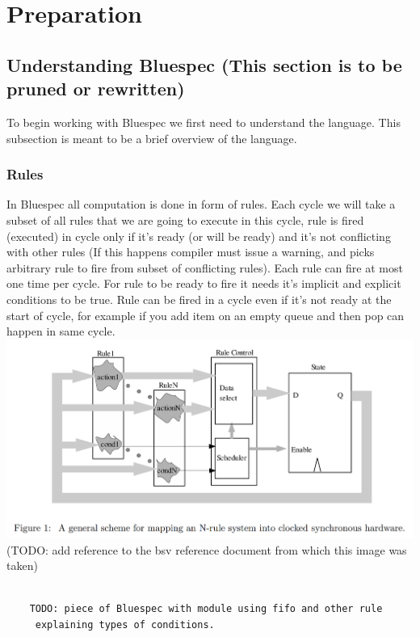\documentclass[14pt]{report}
\begin{document}
\chapter{Preparation}

\section{Understanding Bluespec (This section is to be pruned or rewritten)}
To begin working with Bluespec we first need to understand the language. This subsection is meant to be a brief overview of the language.
\subsection{Rules}
 In Bluespec all computation is done in form of rules. Each cycle we will take a subset of all rules that we are going to execute in this cycle, rule is fired (executed) in cycle only if it's ready (or will be ready) and it's not conflicting with other rules (If this happens compiler must issue a warning, and picks arbitrary rule to fire from subset of conflicting rules). Each rule can fire at most one time per cycle. For rule to be ready to fire it needs it's implicit and explicit conditions to be true. Rule can be fired in a cycle even if it's not ready at the start of cycle, for example if you add item on an empty queue and then pop can happen in same cycle. \\
\includegraphics[width=\textwidth]{Rulemapping.png}
(TODO: add reference to the bsv reference document from which this image was taken)
\begin{verbatim}
        
    TODO: piece of Bluespec with module using fifo and other rule
     explaining types of conditions.
    
\end{verbatim}
\end{document}
